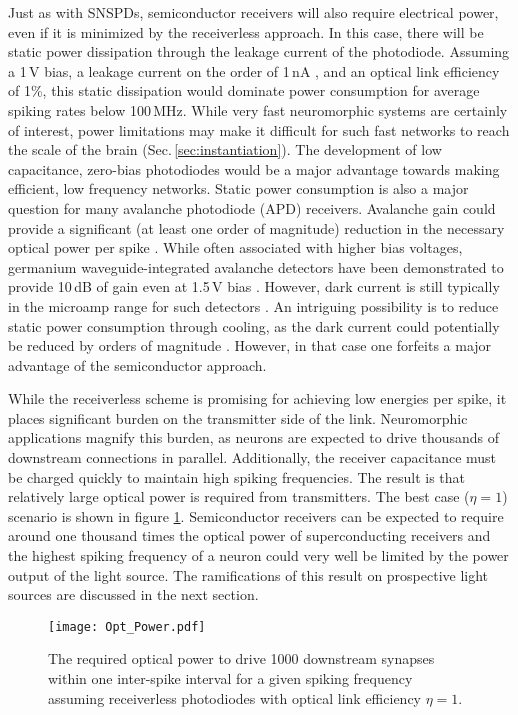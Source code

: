 \documentclass[twocolumn]{article}
\begin{document}
Just as with SNSPDs, semiconductor receivers will also require electrical power, even if it is minimized by the receiverless approach. In this case, there will be static power dissipation through the leakage current of the photodiode. Assuming a 1\,V bias, a leakage current on the order of 1\,nA \cite{zhang2020scalable}, and an optical link efficiency of 1\%, this static dissipation would dominate power consumption for average spiking rates below 100\,MHz. While very fast neuromorphic systems are certainly of interest, power limitations may make it difficult for such fast networks to reach the scale of the brain (Sec.\,\ref{sec:instantiation}). The development of low capacitance, zero-bias photodiodes \cite{nozaki2018forward} would be a major advantage towards making efficient, low frequency networks. Static power consumption is also a major question for many avalanche photodiode (APD) receivers. Avalanche gain could provide a significant (at least one order of magnitude) reduction in the necessary optical power per spike \cite{miller2017attojoule}. While often associated with higher bias voltages, germanium waveguide-integrated avalanche detectors have been demonstrated to provide 10\,dB of gain even at 1.5\,V bias \cite{assefa2010reinventing}. However, dark current is still typically in the microamp range for such detectors \cite{assefa2010reinventing,virot2014germanium}. An intriguing possibility is to reduce static power consumption through cooling, as the dark current could potentially be reduced by orders of magnitude \cite{pizzone2020analysis}. However, in that case one forfeits a major advantage of the semiconductor approach.

While the receiverless scheme is promising for achieving low energies per spike, it places significant burden on the transmitter side of the link. Neuromorphic applications magnify this burden, as neurons are expected to drive thousands of downstream connections in parallel. Additionally, the receiver capacitance must be charged quickly to maintain high spiking frequencies. The result is that relatively large optical power is required from transmitters. The best case ($\eta = 1$) scenario is shown in figure \ref{fig:communication}. Semiconductor receivers can be expected to require around one thousand times the optical power of superconducting receivers and the highest spiking frequency of a neuron could very well be limited by the power output of the light source. The ramifications of this result on prospective light sources are discussed in the next section. 
\begin{figure}[h!]
    \centering
    \texttt{[image: Opt\_Power.pdf]}
    \caption{The required optical power to drive 1000 downstream synapses within one inter-spike interval for a given spiking frequency assuming receiverless photodiodes with optical link efficiency $\eta = 1$.}
    \label{fig:communication}
\end{figure}
\end{document}
